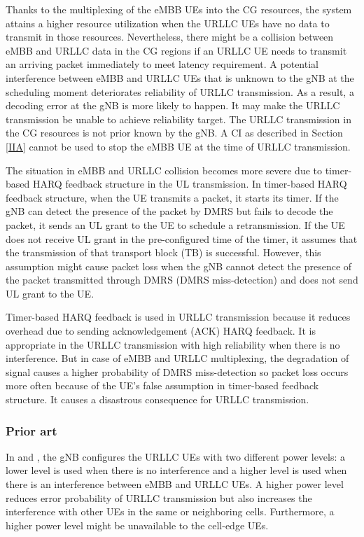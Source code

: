\documentclass{ieeeaccess}
\begin{document}
Thanks to the multiplexing of the eMBB UEs into the CG resources, the system attains a higher resource utilization when the URLLC UEs have no data to transmit in those resources. Nevertheless, there might be a collision between eMBB and URLLC data in the CG regions if an URLLC UE needs to transmit an arriving packet immediately to meet latency requirement. A potential interference between eMBB and URLLC UEs that is unknown to the gNB at the scheduling moment deteriorates reliability of URLLC transmission. As a result, a decoding error at the gNB is more likely to happen. It may make the URLLC transmission be unable to achieve reliability target. The URLLC transmission in the CG resources is not prior known by the gNB. A CI as described in Section \ref{IIA} cannot be used to stop the eMBB UE at the time of URLLC transmission.

The situation in eMBB and URLLC collision becomes more severe due to timer-based HARQ feedback structure in the UL transmission. In timer-based HARQ feedback structure, when the UE transmits a packet, it starts its timer. If the gNB can detect the presence of the packet by DMRS but fails to decode the packet, it sends an UL grant to the UE to schedule a retransmission. If the UE does not receive UL grant in the pre-configured time of the timer, it assumes that the transmission of that transport block (TB) is successful. However, this assumption might cause packet loss when the gNB cannot detect the presence of the packet transmitted through DMRS (DMRS miss-detection) and does not send UL grant to the UE. 

Timer-based HARQ feedback is used in URLLC transmission because it reduces overhead due to sending acknowledgement (ACK) HARQ feedback. It is appropriate in the URLLC transmission with high reliability when there is no interference. But in case of eMBB and URLLC multiplexing, the degradation of signal causes a higher probability of DMRS miss-detection so packet loss occurs more often because of the UE's false assumption in timer-based feedback structure. It causes a disastrous consequence for URLLC transmission.

\subsubsection{Prior art} \label{IIBN}

In \cite{ref13} and \cite {ref14}, the gNB configures the URLLC UEs with two different power levels: a lower level is used when there is no interference and a higher level is used when there is an interference between eMBB and URLLC UEs. A higher power level reduces error probability of URLLC transmission but also increases the interference with other UEs in the same or neighboring cells. Furthermore, a higher power level might be unavailable to the cell-edge UEs.
\end{document}
